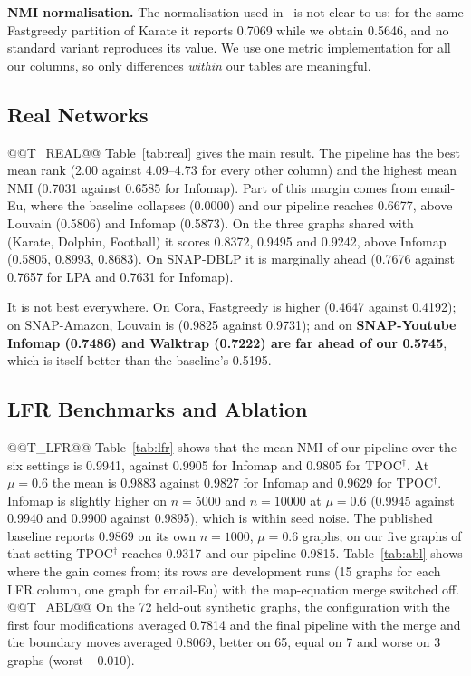\documentclass[conference]{IEEEtran}
\begin{document}
\textbf{NMI normalisation.} The normalisation used in~\cite{kong2026} is not clear to us: for the same Fastgreedy partition of Karate it reports 0.7069 while we obtain 0.5646, and no standard variant reproduces its value. We use one metric implementation for all our columns, so only differences \emph{within} our tables are meaningful.

\subsection{Real Networks}
@@T_REAL@@
Table~\ref{tab:real} gives the main result. The pipeline has the best mean rank (2.00 against 4.09--4.73 for every other column) and the highest mean NMI (0.7031 against 0.6585 for Infomap). Part of this margin comes from email-Eu, where the baseline collapses (0.0000) and our pipeline reaches 0.6677, above Louvain (0.5806) and Infomap (0.5873). On the three graphs shared with~\cite{kong2026} (Karate, Dolphin, Football) it scores 0.8372, 0.9495 and 0.9242, above Infomap (0.5805, 0.8993, 0.8683). On SNAP-DBLP it is marginally ahead (0.7676 against 0.7657 for LPA and 0.7631 for Infomap).

It is not best everywhere. On Cora, Fastgreedy is higher (0.4647 against 0.4192); on SNAP-Amazon, Louvain is (0.9825 against 0.9731); and on \textbf{SNAP-Youtube Infomap (0.7486) and Walktrap (0.7222) are far ahead of our 0.5745}, which is itself better than the baseline's 0.5195.

\subsection{LFR Benchmarks and Ablation}
@@T_LFR@@
Table~\ref{tab:lfr} shows that the mean NMI of our pipeline over the six settings is 0.9941, against 0.9905 for Infomap and 0.9805 for TPOC$^{\dagger}$. At $\mu{=}0.6$ the mean is 0.9883 against 0.9827 for Infomap and 0.9629 for TPOC$^{\dagger}$. Infomap is slightly higher on $n{=}5000$ and $n{=}10000$ at $\mu{=}0.6$ (0.9945 against 0.9940 and 0.9900 against 0.9895), which is within seed noise. The published baseline reports 0.9869 on its own $n{=}1000$, $\mu{=}0.6$ graphs; on our five graphs of that setting TPOC$^{\dagger}$ reaches 0.9317 and our pipeline 0.9815. Table~\ref{tab:abl} shows where the gain comes from; its rows are development runs (15 graphs for each LFR column, one graph for email-Eu) with the map-equation merge switched off.
@@T_ABL@@
On the 72 held-out synthetic graphs, the configuration with the first four modifications averaged 0.7814 and the final pipeline with the merge and the boundary moves averaged 0.8069, better on 65, equal on 7 and worse on 3 graphs (worst $-0.010$).
\end{document}
